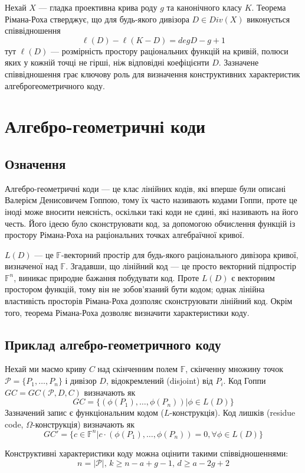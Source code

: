 \documentclass[a4paper,12pt,oneside]{article}
\begin{document}
Нехай $X$ --- гладка проективна крива роду $g$ та канонічного класу $K$. Теорема Рімана-Роха стверджує, 
що для будь-якого дивізора $D \in Div(X)$ виконується співвідношення
$$\ell(D) - \ell(K-D) = deg D - g +1$$
тут $\ell(D)$ --- розмірність простору раціональних функцій на кривій, полюси яких у кожній точці не гірші, 
ніж відповідні коефіцієнти $D$. Зазначене співвідношення грає ключову роль для визначення конструктивних 
характеристик алгеброгеометричного коду.

\section{Алгебро-геометричні коди}
\subsection{Означення}
Алгебро-геометричні коди --- це клас лінійних кодів, які вперше були описані Валерієм Денисовичем Гоппою, 
тому їх часто називають кодами Гоппи, проте це іноді може вносити неясність, оскільки такі коди не єдині, які називають на його честь. 
Його ідеєю було сконструювати код, за допомогою обчислення функцій із простору Рімана-Роха на раціональних точках алгебраїчної кривої. 

$L(D)$ --- це $\mathbb{F}$-векторний простір для будь-якого раціонального дивізора кривої, визначеної над $\mathbb{F}$. 
Згадавши, що лінійний код --- це просто векторний підпростір $\mathbb{F}^n$, виникає природне бажання побудувати код. 
Проте $L(D)$ є векторним простором функцій, тому він не зобов'язаний бути кодом; однак лінійна властивість просторів Рімана-Роха дозполяє сконструювати лінійний код. 
Окрім того, теорема Рімана-Роха дозволяє визначити характеристики коду.

\subsection{Приклад алгебро-геометричного коду}
Нехай ми маємо криву $C$ над скінченним полем $\mathbb{F}$, скінченну множину точок $\mathcal{P} = \{P_1, \dots , P_n \}$ і дивізор $D$, відокремлений (disjoint) від $P_i$. 
Код Гоппи $GC = GC(\mathcal{P}, D, C)$ визначають як
$$GC = \{ (\phi(P_1), \dots , \phi(P_n)) | \phi \in L(D) \}$$
Зазначений запис є функціональним кодом ($L$-конструкція). Код лишків (residue code, $\Omega$-конструкція) визначають як
$$GC' = \{ c \in \mathbb{F}^n | c \cdot (\phi(P_1), \dots , \phi(P_n)) = 0, \forall \phi \in L(D) \}$$

Конструктивні характеристики коду можна оцінити такими співвідношеннями:
$$n=|\mathcal{P}|, \, k \ge n-a+g-1, \, d \ge a-2g+2$$
\end{document}
